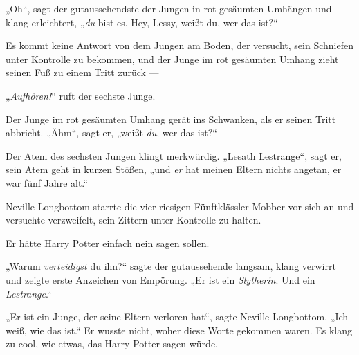 „Oh“, sagt der gutaussehendste der Jungen in rot gesäumten Umhängen und klang erleichtert,
„\emph{du} bist es. Hey, Lessy, weißt du, wer das ist?“

Es kommt keine Antwort von dem Jungen am Boden, der versucht, sein Schniefen unter Kontrolle zu bekommen, und der Junge im rot gesäumten Umhang zieht seinen Fuß zu einem Tritt zurück —

„\emph{Aufhören!}“ ruft der sechste Junge.

Der Junge im rot gesäumten Umhang gerät ins Schwanken, als er seinen Tritt abbricht. „Ähm“, sagt er, „weißt \emph{du}, wer das ist?“

Der Atem des sechsten Jungen klingt merkwürdig.
„Lesath Lestrange“, sagt er, sein Atem geht in kurzen Stößen, „und \emph{er} hat meinen Eltern nichts angetan, er war fünf Jahre alt.“

\later

Neville Longbottom starrte die vier riesigen Fünftklässler-Mobber vor sich an und versuchte verzweifelt, sein Zittern unter Kontrolle zu halten.

Er hätte Harry Potter einfach nein sagen sollen.

„Warum \emph{verteidigst} du ihn?“ sagte der gutaussehende langsam, klang verwirrt und zeigte erste Anzeichen von Empörung.
„Er ist ein \emph{Slytherin}. Und ein \emph{Lestrange}.“

„Er ist ein Junge, der seine Eltern verloren hat“, sagte Neville Longbottom.
„Ich weiß, wie das ist.“ Er wusste nicht, woher diese Worte gekommen waren. Es klang zu cool, wie etwas, das Harry Potter sagen würde.

